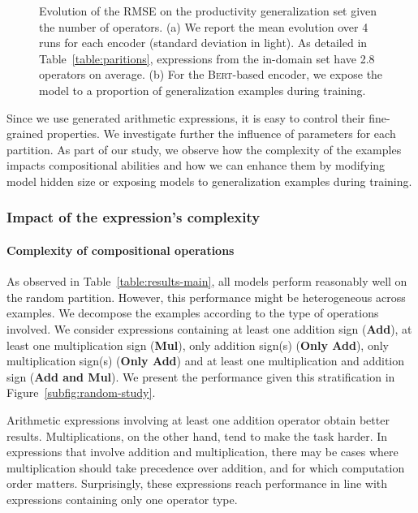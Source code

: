 \begin{figure}[htb!]
\begin{subfigure}[b]{7.52cm}
        \caption{}
        \label{fig:productivity-exposition}
    \end{subfigure}
    \caption{Evolution of the RMSE on the productivity generalization set given the number of operators. (a) We report the mean evolution over 4 runs for each encoder (standard deviation in light). As detailed in Table~\ref{table:paritions}, expressions from the in-domain set have 2.8 operators on average. (b) For the \textsc{Bert}-based encoder, we expose the model to a proportion of generalization examples during training.}
\end{figure}

Since we use generated arithmetic expressions, it is easy to control their fine-grained properties. We investigate further the influence of parameters for each partition. As part of our study, we observe how the complexity of the examples impacts compositional abilities and how we can enhance them by modifying model hidden size or exposing models to generalization examples during training.

\subsubsection{Impact of the expression's complexity}

\paragraph{Complexity of compositional operations} As observed in Table~\ref{table:results-main}, all models perform reasonably well on the random partition. However, this performance might be heterogeneous across examples. We decompose the examples according to the type of operations involved. We consider expressions containing at least one addition sign (\textbf{Add}), at least one multiplication sign (\textbf{Mul}), only addition sign(s) (\textbf{Only Add}), only multiplication sign(s) (\textbf{Only Add}) and at least one multiplication and addition sign (\textbf{Add and Mul}). We present the performance given this stratification in Figure~\ref{subfig:random-study}.

Arithmetic expressions involving at least one addition operator obtain better results. Multiplications, on the other hand, tend to make the task harder. In expressions that involve addition and multiplication, there may be cases where multiplication should take precedence over addition, and for which computation order matters. Surprisingly, these expressions reach performance in line with expressions containing only one operator type. 

